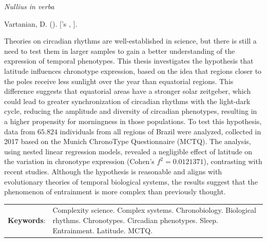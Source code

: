 \documentclass[
12pt,
openright,
oneside,
a4paper,
chapter=TITLE,
section=TITLE,
french,
spanish,
brazil,
english
]{abntex2}
\renewcommand{\epigraphname}{Epigraph}
\renewcommand{\resumoname}{Abstract}
\renewcommand{\epigraphname}{Epígrafe}
\renewcommand{\resumoname}{Resumo}
\renewcommand{\epigraphname}{Epígrafe}
\renewcommand{\resumoname}{Resumen}
\renewcommand{\epigraphname}{Épigraphe}
\renewcommand{\resumoname}{Résumé}
\providecommand{\imprimiruniversidade}{}
\providecommand{\imprimirtipodetituloacademico}{}
\newenvironment{resumoenv}[1][\resumoname]{
  \pretextualchapter{#1}
  \begingroup
  \setlength{\parindent}{0cm}
  \setlength{\parskip}{\smallskipamount} %
  \AtBeginEnvironment{tabular}{\normalsize}
  \renewcommand{\arraystretch}{1}
  \setlength{\aboverulesep}{0ex}
  \setlength{\belowrulesep}{0ex}
  \setlength{\arrayrulewidth}{0pt}
  \setlength{\tabcolsep}{0cm}
  \vspace{-\smallskipamount} %
  \begin{SingleSpace}
}{
  \end{SingleSpace}
  \cleardoublepage
  \endgroup
}
\renewcommand{\arraystretch}{1.5}
\begin{document}

\begin{epigrafe}[] %
\vspace*{\fill} %
\begin{flushright}
\textit{Nullius in verba}\footnotemark{}

\end{flushright}
\end{epigrafe}


\begin{resumoenv}[\resumoname]
Vartanian, D. ({\imprimirdata}). \textit{\imprimirtitulo} [{\imprimirtipodetituloacademico}'s {\imprimirtipotrabalho}, {\imprimiruniversidade}].


Theories on circadian rhythms are well-established in science, but there
is still a need to test them in larger samples to gain a better
understanding of the expression of temporal phenotypes. This thesis
investigates the hypothesis that latitude influences chronotype
expression, based on the idea that regions closer to the poles receive
less sunlight over the year than equatorial regions. This difference
suggests that equatorial areas have a stronger solar zeitgeber, which
could lead to greater synchronization of circadian rhythms with the
light-dark cycle, reducing the amplitude and diversity of circadian
phenotypes, resulting in a higher propensity for morningness in those
populations. To test this hypothesis, data from \(65.824\) individuals
from all regions of Brazil were analyzed, collected in 2017 based on the
Munich ChronoType Questionnaire (MCTQ). The analysis, using nested
linear regression models, revealed a negligible effect of latitude on
the variation in chronotype expression (Cohen's \(f^2 = 0.0121371\)),
contrasting with recent studies. Although the hypothesis is reasonable
and aligns with evolutionary theories of temporal biological systems,
the results suggest that the phenomenon of entrainment is more complex
than previously thought.


\begin{tabular}{p{2.3cm} p{13.6cm}}
  \textbf{Keywords}: & Complexity science. Complex systems. Chronobiology. Biological rhythms. Chronotypes. Circadian phenotypes. Sleep. Entrainment. Latitude. MCTQ.
\end{tabular}
\end{resumoenv}
\end{document}
